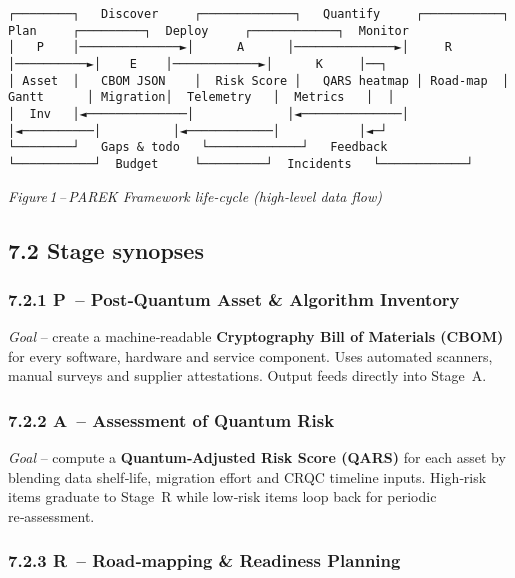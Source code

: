 \documentclass[
  english,
]{article}
\begin{document}
\begin{verbatim}
┌────────┐   Discover     ┌─────────────┐   Quantify     ┌───────────┐   Plan     ┌─────────┐  Deploy     ┌────────────┐  Monitor
│   P    │──────────────►│      A      │──────────────►│     R     │──────────►│    E    │────────────►│      K     │──┐
│ Asset  │   CBOM JSON    │  Risk Score │   QARS heatmap │ Road‑map  │  Gantt      │ Migration│  Telemetry   │  Metrics   │  │
│  Inv   │◄──────────────│             │◄──────────────│           │◄──────────│          │◄────────────│           │◄─┘
└────────┘   Gaps & todo   └─────────────┘   Feedback     └───────────┘  Budget     └─────────┘  Incidents   └────────────┘
\end{verbatim}

\emph{Figure\,1\,--\,PAREK Framework life‑cycle (high‑level data flow)}

\subsection{7.2 Stage synopses}\label{stage-synopses}

\subsubsection{\texorpdfstring{7.2.1 \textbf{P~-- Post‑Quantum Asset \&
Algorithm
Inventory}}{7.2.1 P~-- Post‑Quantum Asset \& Algorithm Inventory}}\label{p-postquantum-asset-algorithm-inventory}

\emph{Goal} -- create a machine‑readable \textbf{Cryptography Bill of
Materials (CBOM)} for every software, hardware and service component.
Uses automated scanners, manual surveys and supplier attestations.
Output feeds directly into Stage~A.

\subsubsection{\texorpdfstring{7.2.2 \textbf{A~-- Assessment of Quantum
Risk}}{7.2.2 A~-- Assessment of Quantum Risk}}\label{a-assessment-of-quantum-risk}

\emph{Goal} -- compute a \textbf{Quantum‑Adjusted Risk Score (QARS)} for
each asset by blending data shelf‑life, migration effort and CRQC
timeline inputs. High‑risk items graduate to Stage~R while low‑risk
items loop back for periodic re‑assessment.

\subsubsection{\texorpdfstring{7.2.3 \textbf{R~-- Road‑mapping \&
Readiness
Planning}}{7.2.3 R~-- Road‑mapping \& Readiness Planning}}\label{r-roadmapping-readiness-planning}
\end{document}
